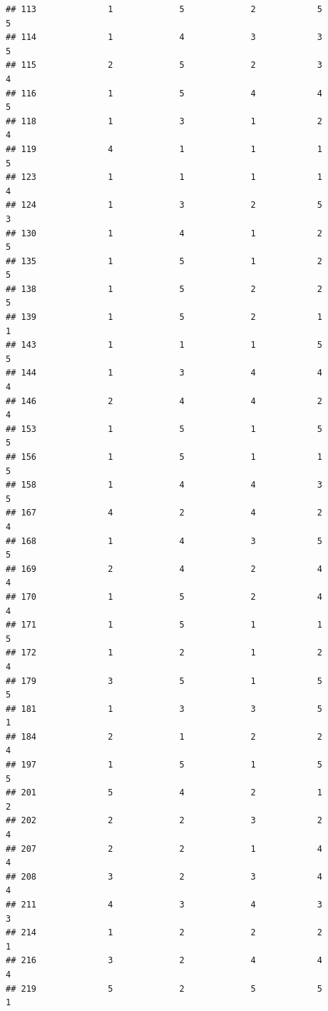 \documentclass[
]{article}
\begin{document}
\begin{verbatim}
## 113              1             5             2            5          5
## 114              1             4             3            3          5
## 115              2             5             2            3          4
## 116              1             5             4            4          5
## 118              1             3             1            2          4
## 119              4             1             1            1          5
## 123              1             1             1            1          4
## 124              1             3             2            5          3
## 130              1             4             1            2          5
## 135              1             5             1            2          5
## 138              1             5             2            2          5
## 139              1             5             2            1          1
## 143              1             1             1            5          5
## 144              1             3             4            4          4
## 146              2             4             4            2          4
## 153              1             5             1            5          5
## 156              1             5             1            1          5
## 158              1             4             4            3          5
## 167              4             2             4            2          4
## 168              1             4             3            5          5
## 169              2             4             2            4          4
## 170              1             5             2            4          4
## 171              1             5             1            1          5
## 172              1             2             1            2          4
## 179              3             5             1            5          5
## 181              1             3             3            5          1
## 184              2             1             2            2          4
## 197              1             5             1            5          5
## 201              5             4             2            1          2
## 202              2             2             3            2          4
## 207              2             2             1            4          4
## 208              3             2             3            4          4
## 211              4             3             4            3          3
## 214              1             2             2            2          1
## 216              3             2             4            4          4
## 219              5             2             5            5          1

\end{verbatim}
\end{document}
